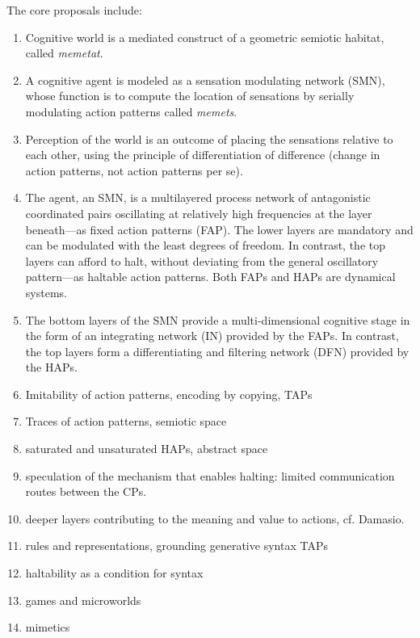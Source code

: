 The core proposals include:
\begin{enumerate}
    \item Cognitive world is a mediated construct of a geometric semiotic habitat, called \textit{memetat}. 
    \item A cognitive agent is modeled as a sensation modulating network (SMN), whose function is to compute the location of sensations by serially modulating action patterns called \textit{memets}.  
    \item Perception of the world is an outcome of placing the sensations relative to each other, using the principle of differentiation of difference (change in action patterns, not action patterns per se).  
    \item The agent, an SMN, is a multilayered process network of antagonistic coordinated pairs oscillating at relatively high frequencies at the layer beneath---as fixed action patterns (FAP).  The lower layers are mandatory and can be modulated with the least degrees of freedom. In contrast, the top layers can afford to halt, without deviating from the general oscillatory pattern---as haltable action patterns.  Both FAPs and HAPs are dynamical systems.
    \item The bottom layers of the SMN provide a multi-dimensional cognitive stage in the form of an integrating network (IN) provided by the FAPs. In contrast, the top layers form a differentiating and filtering network (DFN) provided by the HAPs. 
    \item 
    Imitability of action patterns, encoding by copying, TAPs
    \item Traces of action patterns, semiotic space 
    \item saturated and unsaturated HAPs, abstract space
    \item speculation of the mechanism that enables halting: limited communication routes between the CPs. 
    \item deeper layers contributing to the meaning and value to actions, cf. Damasio. 
    \item rules and representations, grounding generative syntax TAPs 
    \item haltability as a condition for syntax 
    \item games and microworlds
    \item mimetics 
\end{enumerate}
